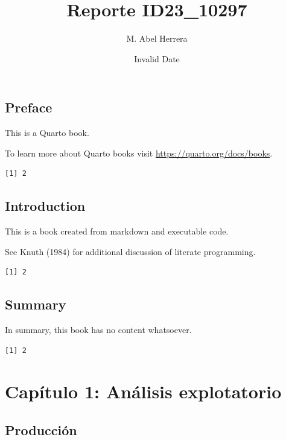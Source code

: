 \documentclass[
  letterpaper,
  DIV=11,
  numbers=noendperiod]{scrreprt}
\title{Reporte ID23\_10297}
\author{M. Abel Herrera}
\date{Invalid Date}
\renewcommand*\contentsname{Tabla de contenidos}
\newcommand\contentsname{Tabla de contenidos}
\begin{document}
\maketitle

\renewcommand*\contentsname{Tabla de contenidos}
{
\hypersetup{linkcolor=}
\setcounter{tocdepth}{2}
\tableofcontents
}

\chapter*{Preface}\label{preface}


This is a Quarto book.

To learn more about Quarto books visit
\url{https://quarto.org/docs/books}.

\begin{verbatim}
[1] 2
\end{verbatim}


\chapter{Introduction}\label{introduction}

This is a book created from markdown and executable code.

See Knuth (1984) for additional discussion of literate programming.

\begin{verbatim}
[1] 2
\end{verbatim}


\chapter{Summary}\label{summary}

In summary, this book has no content whatsoever.

\begin{verbatim}
[1] 2
\end{verbatim}

\part{Capítulo 1: Análisis explotatorio}

\chapter{Producción}\label{producciuxf3n}
\end{document}
